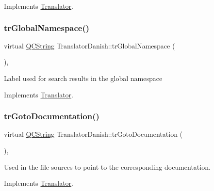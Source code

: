 Implements \mbox{\hyperlink{class_translator}{Translator}}.

\mbox{\label{class_translator_danish_ac29a78886ffbbe26155c998d6a15b82b}} 
\subsubsection{\texorpdfstring{trGlobalNamespace()}{trGlobalNamespace()}}
{\footnotesize\ttfamily virtual \mbox{\hyperlink{class_q_c_string}{Q\+C\+String}} Translator\+Danish\+::tr\+Global\+Namespace (\begin{DoxyParamCaption}{ }\end{DoxyParamCaption})\hspace{0.3cm}{\ttfamily [inline]}, {\ttfamily [virtual]}}

Label used for search results in the global namespace 

Implements \mbox{\hyperlink{class_translator}{Translator}}.

\mbox{\label{class_translator_danish_ab1ac30ddf6f9931ca4a1a2a172a8842a}} 
\subsubsection{\texorpdfstring{trGotoDocumentation()}{trGotoDocumentation()}}
{\footnotesize\ttfamily virtual \mbox{\hyperlink{class_q_c_string}{Q\+C\+String}} Translator\+Danish\+::tr\+Goto\+Documentation (\begin{DoxyParamCaption}{ }\end{DoxyParamCaption})\hspace{0.3cm}{\ttfamily [inline]}, {\ttfamily [virtual]}}

Used in the file sources to point to the corresponding documentation. 

Implements \mbox{\hyperlink{class_translator}{Translator}}.

\mbox{\label{class_translator_danish_a2e5b849f3850979290affa099e3cc08f}} 
